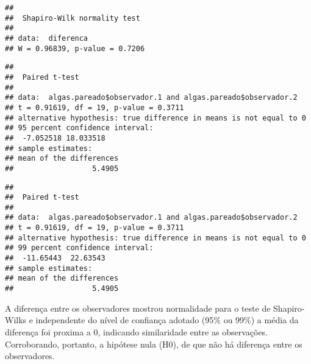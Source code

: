 \documentclass[14pt,titlepage, oneside, openany, a4paper]{book}
\newenvironment{Shaded}{\begin{snugshade}}{\end{snugshade}}
\newcommand{\DataTypeTok}[1]{\textcolor[rgb]{0.13,0.29,0.53}{#1}}
\newcommand{\FloatTok}[1]{\textcolor[rgb]{0.00,0.00,0.81}{#1}}
\newcommand{\KeywordTok}[1]{\textcolor[rgb]{0.13,0.29,0.53}{\textbf{#1}}}
\newcommand{\NormalTok}[1]{#1}
\newcommand{\OperatorTok}[1]{\textcolor[rgb]{0.81,0.36,0.00}{\textbf{#1}}}
\newcommand{\OtherTok}[1]{\textcolor[rgb]{0.56,0.35,0.01}{#1}}
\begin{document}
\begin{verbatim}
## 
##  Shapiro-Wilk normality test
## 
## data:  diferenca
## W = 0.96839, p-value = 0.7206
\end{verbatim}

\begin{Shaded}
\end{Shaded}

\begin{verbatim}
## 
##  Paired t-test
## 
## data:  algas.pareado$observador.1 and algas.pareado$observador.2
## t = 0.91619, df = 19, p-value = 0.3711
## alternative hypothesis: true difference in means is not equal to 0
## 95 percent confidence interval:
##  -7.052518 18.033518
## sample estimates:
## mean of the differences 
##                  5.4905
\end{verbatim}

\begin{Shaded}
\end{Shaded}

\begin{verbatim}
## 
##  Paired t-test
## 
## data:  algas.pareado$observador.1 and algas.pareado$observador.2
## t = 0.91619, df = 19, p-value = 0.3711
## alternative hypothesis: true difference in means is not equal to 0
## 99 percent confidence interval:
##  -11.65443  22.63543
## sample estimates:
## mean of the differences 
##                  5.4905
\end{verbatim}

A diferença entre os observadores mostrou normalidade para o teste de Shapiro-Wilks e independente do nível de confiança adotado (95\% ou 99\%) a média da diferença foi proxima a 0, indicando similaridade entre as observações. Corroborando, portanto, a hipótese nula (H0), de que não há diferença entre os observadores.


\end{document}
